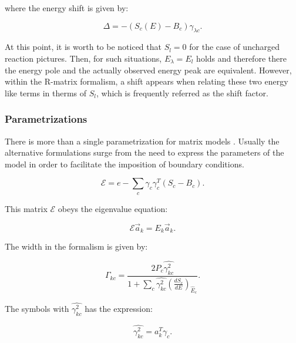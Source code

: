 \documentclass[openany]{book}
\begin{document}
where the energy shift is given by: 

\begin{equation}  \label{eq:rmatrix_energyShift}
	\Delta = -(S_c(E) - B_c)\gamma_{\lambda c}.
\end{equation}

At this point, it is worth to be noticed that $S_l = 0$ for the case of uncharged reaction pictures. Then, for such situations, $E_\lambda = E_l$ holds and therefore there the energy pole and the actually observed energy peak are equivalent. However, within the R-matrix formalism, a shift appears when relating these two energy like terms in therms of $S_l$, which is frequently referred as the shift factor. \\

\subsubsection{Parametrizations} \label{ssub:rmatrix_phenomenological_parametrizations}

There is more than a single parametrization for matrix models \cite{brune_2002}. Usually the alternative formulations surge from the need to express the parameters of the model in order to facilitate the imposition of boundary conditions.  

\begin{equation}\label{eq:rmatrix_E}
	\mathcal{E} = e - \sum_{c}{\gamma_c \gamma^{T}_c (S_c - B_c)}.
\end{equation}

This matrix $\mathcal{E}$ obeys the eigenvalue equation:

\begin{equation}\label{eq:rmatrix_E_values}
	\mathcal{E}\vec a_k = E_k \vec a_k.
\end{equation}

The width in the formalism is given by:

\begin{equation}\label{eq:rmatrix_width}
	\Gamma_{kc} = \frac{2P_c \hat {{\gamma}^2_{kc}}}{1 + \sum_{c}{\hat {{\gamma}^2_{kc}} \left(\frac{dS_c}{dE}\right)_{\hat{E}_c}  }}.
\end{equation}

The symbols with $\hat {{\gamma}^2_{kc}}$ has the expression: 

\begin{equation}\label{eq:rmatrix_width_reduced}
	\hat {{\gamma}^2_{kc}} = a^{T}_{k} \gamma_c.
\end{equation}
\end{document}
